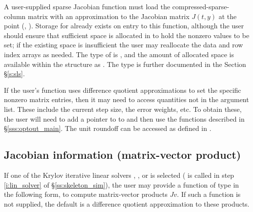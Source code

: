 {
  A user-supplied sparse Jacobian function must load the
  compressed-sparse-column matrix  with an approximation to
  the Jacobian matrix $J(t,y)$ at the point (, ).  Storage
  for  already exists on entry to this function, although the
  user should ensure that sufficient space is allocated in  to
  hold the nonzero values to be set; if the existing space is
  insufficient the user may reallocate the data and row index arrays
  as needed.  The type of  is , and the amount of
  allocated space is available within the  structure as
  .  The  type is further documented in the Section
  \S\ref{s:sls}.
 
  If the user's  function uses difference quotient
  approximations to set the specific nonzero matrix entries, then it
  may need to access quantities not in the argument list. These
  include the current step size, the error weights, etc.
  To obtain these, the user will need to add a pointer to  
  to  and then use the  functions described in
  \S\ref{sss:optout_main}. The unit roundoff can be accessed as
   defined in . 
}

\subsection{Jacobian information (matrix-vector product)}\label{ss:jtimesFn}

If one of the Krylov iterative linear solvers {\spgmr}, {\spbcg}, or {\sptfqmr}
is selected ( is called in step \ref{i:lin_solver} of
\S\ref{ss:skeleton_sim}), the user may provide a function of type
 in the following form,
to compute matrix-vector products $Jv$. If such a function is not supplied,
the default is a difference quotient approximation to these products.

